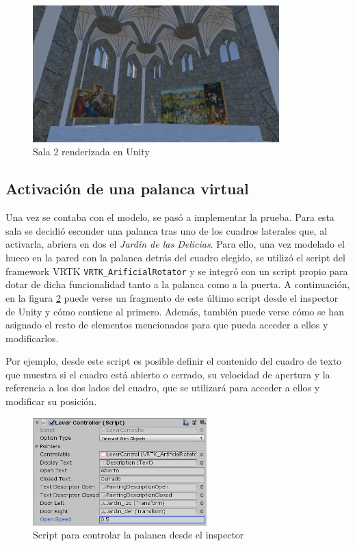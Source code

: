 \begin{figure}[!h]
\begin{center}
\includegraphics[width=0.85\textwidth]{imagenes/7/salas-unity/unity-sala-2.png}
\caption{Sala 2 renderizada en Unity}
\label{fig:unity-sala-2}
\end{center}
\end{figure}

\subsection{Activación de una palanca virtual}

Una vez se contaba con el modelo, se pasó a implementar la prueba. Para esta sala se decidió esconder una palanca tras uno de los cuadros laterales que, al activarla, abriera en dos el \textit{Jardín de las Delicias}. Para ello, una vez modelado el hueco en la pared con la palanca detrás del cuadro elegido, se utilizó el script del framework \acs{VRTK} \texttt{VRTK\_ArificialRotator} y se integró con un script propio para dotar de dicha funcionalidad tanto a la palanca como a la puerta. A continuación, en la figura \ref{fig:lever-controller-inspector} puede verse un fragmento de este último script desde el inspector de Unity y cómo contiene al primero. Además, también puede verse cómo se han asignado el resto de elementos mencionados para que pueda acceder a ellos y modificarlos.

Por ejemplo, desde este script es posible definir el contenido del cuadro de texto que muestra si el cuadro está abierto o cerrado, su velocidad de apertura y la referencia a los dos lados del cuadro, que se utilizará para acceder a ellos y modificar su posición.

\begin{figure}[!h]
\begin{center}
\includegraphics[width=0.6\textwidth]{imagenes/7/lever-controller.png}
\caption{Script para controlar la palanca desde el inspector}
\label{fig:lever-controller-inspector}
\end{center}
\end{figure}

